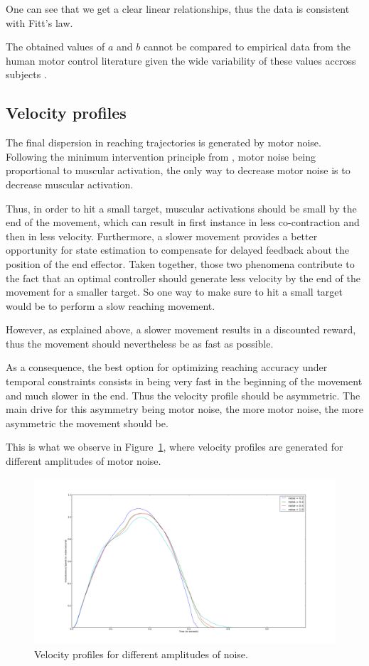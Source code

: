 \documentclass[10pt]{article}
\begin{document}
One can see that we get a clear linear relationships, thus the data is consistent with Fitt's law.

The obtained values of $a$ and $b$ cannot be compared to empirical data from the human motor control literature given the wide variability of these values accross subjects \cite{crossman1983,mackenzie1989}.

\subsection{Velocity profiles}
\label{sec:velo_prof}

The final dispersion in reaching trajectories is generated by motor noise.
Following the minimum intervention principle from \cite{todorov02_NN}, motor noise being proportional to muscular activation, the only way to decrease motor noise is to decrease muscular activation.

Thus, in order to hit a small target, muscular activations should be small
by the end of the movement, which can result in first instance in less co-contraction and then in less velocity. Furthermore, a slower movement provides a better opportunity for state estimation to compensate for delayed feedback about the position of the end effector. Taken together, those two phenomena contribute to the fact that an optimal controller should generate less velocity by the end of the movement for a smaller target.
So one way to make sure to hit a small target would be to perform a slow reaching movement.

However, as explained above, a slower movement results in a discounted reward,
thus the movement should nevertheless be as fast as possible.

As a consequence, the best option for optimizing reaching accuracy under
temporal constraints consists in being very fast in the beginning of the movement
and much slower in the end. Thus the velocity profile should be asymmetric. The main drive
for this asymmetry being motor noise, the more motor noise, the more asymmetric the movement should be.

This is what we observe in Figure~\ref{fig:velocity}, where velocity profiles are generated
for different amplitudes of motor noise.

\begin{figure}[htp]
  \centering
\includegraphics[width=.7\columnwidth]{images/speed_for_diff_noise}
  \caption{Velocity profiles for different amplitudes of noise\label{fig:velocity}.}
\end{figure}
\end{document}
